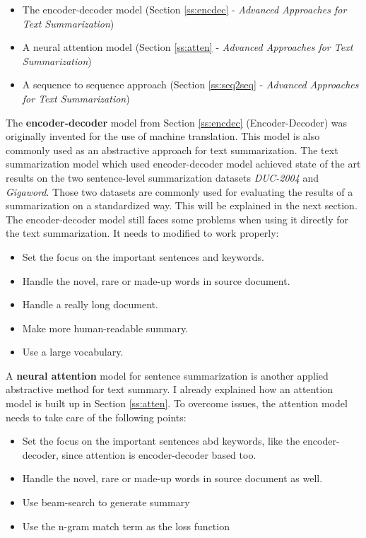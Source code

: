 \begin{itemize}
	\item The encoder-decoder model (Section \ref{ss:encdec} - \textit{Advanced Approaches for Text Summarization})
	\item A neural attention model (Section \ref{ss:atten} - \textit{Advanced Approaches for Text Summarization})
	\item A sequence to sequence approach (Section \ref{ss:seq2seq} - \textit{Advanced Approaches for Text Summarization})
\end{itemize}

The \textbf{encoder-decoder} model from Section \ref{ss:encdec} (Encoder-Decoder) was originally invented for the use of machine translation. 
This model is also commonly used as an abstractive approach for text summarization. The text summarization model which used encoder-decoder model achieved state of the art results on the two sentence-level summarization datasets \textit{DUC-2004} and \textit{Gigaword}. Those two datasets are commonly used for evaluating the results of a summarization on a standardized way. This will be explained in the next section.
The encoder-decoder model still faces some problems when using it directly for the text summarization. It needs to modified to work properly:

\begin{itemize}
	\item Set the focus on the important sentences and keywords.
	\item Handle the novel, rare or made-up words in source document.
	\item Handle a really long document.
	\item Make more human-readable summary.
	\item Use a large vocabulary.
\end{itemize}


A \textbf{neural attention} model for sentence summarization is another applied abstractive method for text summary. I already explained how an attention model is built up in Section \ref{ss:atten}. To overcome issues, the attention model needs to take care of the following points:

\begin{itemize}
	\item Set the focus on the important sentences abd keywords, like the encoder-decoder, since attention is encoder-decoder based too.
	\item Handle the novel, rare or made-up words in source document as well. 
	\item Use beam-search to generate summary
	\item Use the n-gram match term as the loss function
\end{itemize}

